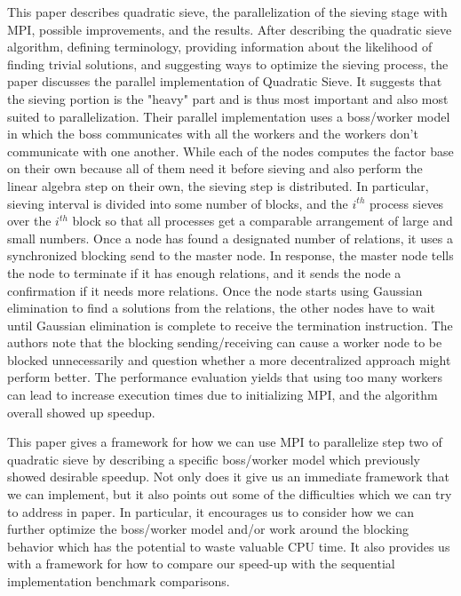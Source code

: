 \documentclass[11pt,twocolumn]{article}
\begin{document}
\indent This paper describes quadratic sieve, the parallelization of the sieving stage with MPI, possible improvements, and the results. After describing the quadratic sieve algorithm, defining terminology, providing information about the likelihood of finding trivial solutions, and suggesting ways to optimize the sieving process, the paper discusses the parallel implementation of Quadratic Sieve. It suggests that the sieving portion is the "heavy" part and is thus most important and also most suited to parallelization. Their parallel implementation uses a boss/worker model in which the boss communicates with all the workers and the workers don't communicate with one another. While each of the nodes computes the factor base on their own because all of them need it before sieving and also perform the linear algebra step on their own, the sieving step is distributed. In particular, sieving interval is divided into some number of blocks, and the $i^{th}$ process sieves over the $i^{th}$ block so that all processes get a comparable arrangement of large and small numbers. Once a node has found a designated number of relations, it uses a synchronized blocking send to the master node. In response, the master node tells the node to terminate if it has enough relations, and it sends the node a confirmation if it needs more relations. Once the node starts using Gaussian elimination to find a solutions from the relations, the other nodes have to wait until Gaussian elimination is complete to receive the termination instruction. The authors note that the blocking sending/receiving can cause a worker node to be blocked unnecessarily and question whether a more decentralized approach might perform better. The performance evaluation yields that using too many workers can lead to increase execution times due to initializing MPI, and the algorithm overall showed up speedup.

This paper gives a framework for how we can use MPI to parallelize step two of quadratic sieve by describing a specific boss/worker model which previously showed desirable speedup. Not only does it give us an immediate framework that we can implement, but it also points out some of the difficulties which we can try to address in paper. In particular, it encourages us to consider how we can further optimize the boss/worker model and/or work around the blocking behavior which has the potential to waste valuable CPU time. It also provides us with a framework for how to compare our speed-up with the sequential implementation benchmark comparisons. \\
\end{document}
